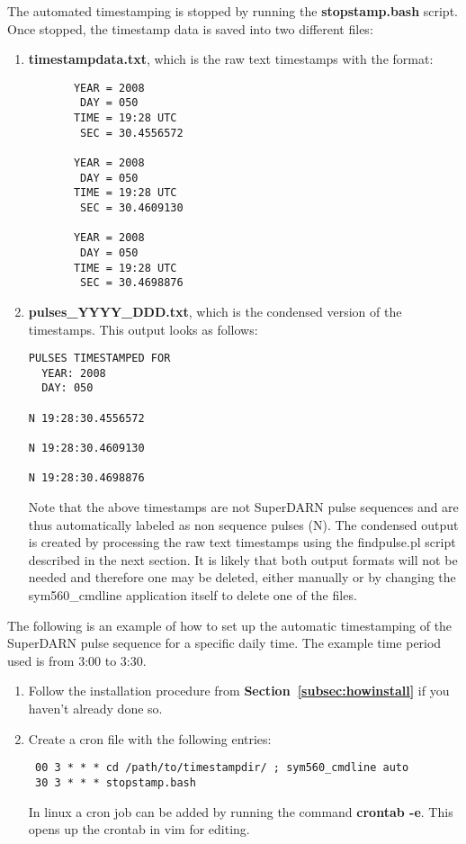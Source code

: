 \documentclass[11pt]{article}
\begin{document}
    The automated timestamping is stopped by running the \textbf{stopstamp.bash} script. Once stopped, the timestamp data is saved into two different files:
    \begin{enumerate}
        \item \textbf{timestampdata.txt}, which is the raw text timestamps with the format:
        \begin{verbatim}
       YEAR = 2008
        DAY = 050
       TIME = 19:28 UTC
        SEC = 30.4556572

       YEAR = 2008
        DAY = 050
       TIME = 19:28 UTC
        SEC = 30.4609130

       YEAR = 2008
        DAY = 050
       TIME = 19:28 UTC
        SEC = 30.4698876
        \end{verbatim}
        \item \textbf{pulses\_YYYY\_DDD.txt}, which is the condensed version of the timestamps. This output looks as follows:
        \begin{verbatim}
PULSES TIMESTAMPED FOR
  YEAR: 2008
  DAY: 050

N 19:28:30.4556572

N 19:28:30.4609130

N 19:28:30.4698876
        \end{verbatim}
        Note that the above timestamps are not SuperDARN pulse sequences and are thus automatically labeled as non sequence pulses (N). The condensed output is created by processing the raw text timestamps using the findpulse.pl script described in the next section. It is likely that both output formats will not be needed and therefore one may be deleted, either manually or by changing the sym560\_cmdline application itself to delete one of the files.
    \end{enumerate}

    The following is an example of how to set up the automatic timestamping of the SuperDARN pulse sequence for a specific daily time. The example time period used is from 3:00 to 3:30.
    \begin{enumerate}
        \item Follow the installation procedure from \textbf{Section~\ref{subsec:howinstall}} if you haven't already done so.
        \item Create a cron file with the following entries:
        \begin{verbatim}
 00 3 * * * cd /path/to/timestampdir/ ; sym560_cmdline auto
 30 3 * * * stopstamp.bash
        \end{verbatim}
        In linux a cron job can be added by running the command \textbf{crontab -e}. This opens up the crontab in vim for editing.
    \end{enumerate}
\end{document}
